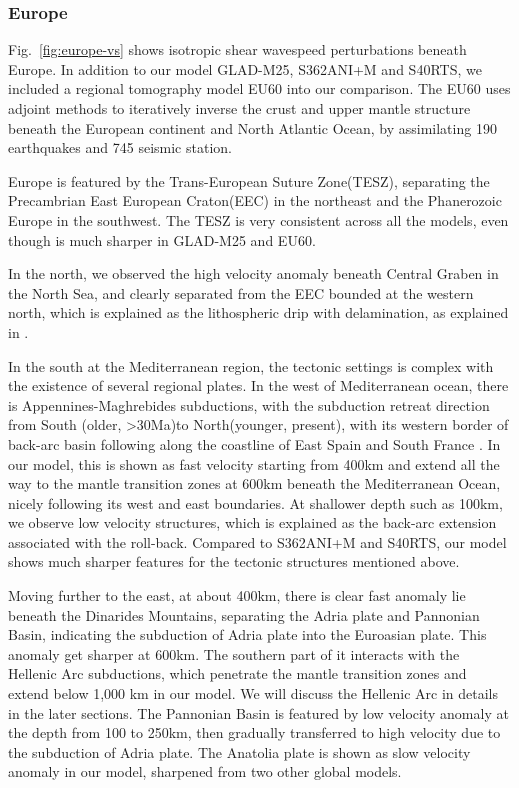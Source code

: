 \documentclass[extra,mreferee]{gji}
\begin{document}
\subsubsection{Europe}

Fig.~\ref{fig:europe-vs} shows isotropic shear wavespeed perturbations beneath Europe.
In addition to our model GLAD-M25, S362ANI+M and S40RTS, we included a regional
tomography model EU60\citep{zhu2015seismic} into our comparison. The EU60 uses
adjoint methods to iteratively inverse the crust and upper mantle structure
beneath the European continent and North Atlantic Ocean, by assimilating
190 earthquakes and 745 seismic station.

Europe is featured by the Trans-European Suture Zone(TESZ), separating the
Precambrian East European Craton(EEC) in the northeast and the Phanerozoic
Europe in the southwest.  The TESZ is very consistent across all the models,
even though is much sharper in GLAD-M25 and EU60.

In the north, we observed the high velocity anomaly beneath Central Graben in the
North Sea, and clearly separated from the EEC bounded at the western north, which is
explained as the lithospheric drip with delamination, as explained in
\cite{zhu2015seismic}.

In the south at the Mediterranean region, the tectonic settings is complex with the
existence of several regional plates. In the west of Mediterranean ocean, there is
Appennines-Maghrebides subductions, with the subduction retreat direction from South
(older, >30Ma)to North(younger, present), with its western border of back-arc basin
following along the coastline of East Spain and South France
\citep{Giordano2017Magmatic}. In our model, this is shown as fast velocity starting
from 400km and extend all the way to the mantle transition zones at 600km beneath the
Mediterranean Ocean, nicely following its west and east boundaries. At shallower depth
such as 100km, we observe low velocity structures, which is explained as the
back-arc extension associated with the roll-back. Compared to S362ANI+M and S40RTS,
our model shows much sharper features for the tectonic structures mentioned above.

Moving further to the east, at about 400km, there is clear fast anomaly lie
beneath the Dinarides Mountains, separating the Adria plate and Pannonian Basin,
indicating the subduction of Adria plate into the Euroasian plate.
This anomaly get sharper at 600km. The southern
part of it interacts with the Hellenic Arc subductions, which penetrate the mantle
transition zones and extend below 1,000 km in our model. We will discuss the Hellenic
Arc in details in the later sections. The Pannonian Basin is featured by low velocity
anomaly at the depth from 100 to 250km, then gradually transferred to high velocity
due to the subduction of Adria plate. The Anatolia plate is shown as slow velocity
anomaly in our model, sharpened from two other global models.
\end{document}
